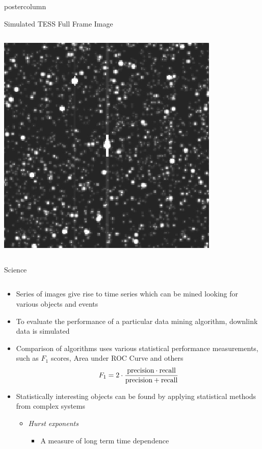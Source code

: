 \documentclass[final,hyperref={pdfpagelabels=false}]{beamer}
\begin{document}
\begin{frame}
\begin{columns}
\begin{column}{.49\textwidth}
\begin{beamercolorbox}[center,wd=\textwidth]{postercolumn}
\begin{minipage}[T]{.95\textwidth}
{\begin{block}{Simulated TESS Full Frame Image}
\begin{columns}
\begin{column}{.28\textwidth}
                  \includegraphics[width=0.80\linewidth]{figures/ffi_simulation.jpg}
		\end{column}
	       \end{columns}
            \end{block}
            \vspace{1cm}
            \begin{block}{Science}
            	\begin{columns}
	                	\begin{column}{.70\textwidth}
		            	\begin{itemize}
					\item Series of images give rise to time series which can be mined looking for various objects and events
					\item To evaluate the performance of a particular data mining algorithm, downlink data is simulated 
					\item Comparison of algorithms uses various statistical performance measurements, such as $F_1$ scores, Area under ROC Curve and others
					$$ F_1 = 2 \cdot \frac{\textup{precision} \cdot \textup{recall}}{\textup{precision} + \textup{recall}} $$
					\item Statistically interesting objects can be found by applying statistical methods from complex systems
					\begin{itemize}
						\item \emph{Hurst exponents} \cite{hurst_longterm_1951}
						\begin{itemize}
							\item A measure of long term time dependence

\end{itemize}
\end{itemize}
\end{itemize}
\end{column}
\end{columns}
\end{block}}
\end{minipage}
\end{beamercolorbox}
\end{column}
\end{columns}
\end{frame}
\end{document}
